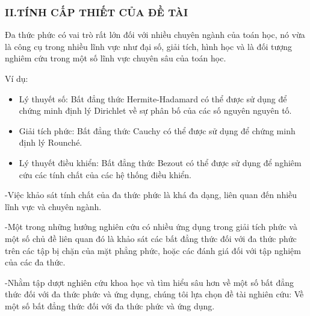 \documentclass{beamer}
\begin{document}
\begin{frame}
\frametitle{II.TÍNH CẤP THIẾT CỦA ĐỀ TÀI}
{\begin{itemize}
\begin{block}{}
Đa thức phức có vai trò rất lớn đối với nhiều chuyên ngành của toán học, nó vừa là công cụ trong nhiều lĩnh vực như đại số, giải tích, hình học và là đối tượng nghiêm cứu trong một số lĩnh vực chuyên sâu của toán học.\par
\vspace{0.3cm}
\par Ví dụ:
\begin{itemize}
\item{Lý thuyết số:}
Bất đẳng thức Hermite-Hadamard có thể được sử dụng để chứng minh định lý Dirichlet về sự phân bố của các số nguyên nguyên tố.
\end{itemize}
\begin{itemize}
\item{Giải tích phức:}
Bất đẳng thức Cauchy có thể được sử dụng để chứng minh định lý Rounché.
\end{itemize}
\begin{itemize}
\item{Lý thuyết điều khiển:}
Bất đẳng thức Bezout có thể được sử dụng để nghiêm cứu các tính chất của các hệ thống điều khiển.
\end{itemize}
\end{block}
\end{itemize}}
\end{frame}


\begin{frame}{}
\begin{block}{}
-Việc khảo sát tính chất của đa thức phức là khá đa dạng,  liên quan đến nhiều lĩnh vực và chuyên ngành.\par
\vspace{0.2cm}
-Một trong những hướng nghiên cứu có nhiều ứng dụng trong giải tích phức và một số chủ đề liên quan đó là khảo sát các bất đẳng thức đối với đa thức phức trên các tập bị chặn của mặt phẳng phức, hoặc các đánh giá đối với tập nghiệm của các đa thức.\par
\vspace{0.2cm}
-Nhằm tập dượt nghiên cứu khoa học và tìm hiểu sâu hơn về một số bất đẳng thức đối với đa thức phức và ứng dụng, chúng tôi lựa chọn đề tài nghiên cứu: Về một số bất đẳng thức đối với đa thức phức và ứng dụng.
\end{block}  
\end{frame}
\end{document}
